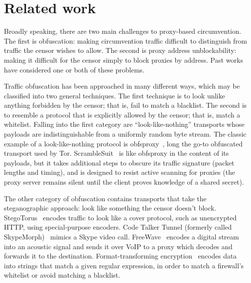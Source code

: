 \documentclass{article}
\begin{document}

\section{Related work}


Broadly speaking, there are two main challenges to proxy-based circumvention.
The first is obfuscation: making circumvention traffic difficult to distinguish
from traffic the censor wishes to allow. The second is proxy address
unblockability: making it difficult for the censor simply to block proxies by
address. Past works have considered one or both of these problems.

Traffic obfuscation has been approached in many different ways,
which may be classified into two general techniques.
The first technique is to look unlike
anything forbidden by the censor; that is, fail to match a blacklist. The second is
to resemble a protocol that is explicitly allowed by the censor; that is, match a whitelist.
Falling into the first category are ``look-like-nothing'' transports whose
payloads are indistinguishable from a uniformly random byte stream.
The classic example of a look-like-nothing
protocol is obfsproxy~\cite{obfsproxy}, long the go-to obfuscated
transport used by Tor. ScrambleSuit~\cite{scramblesuit} is like obfsproxy in the
content of its payloads, but it takes additional steps to obscure its traffic signature
(packet lengths and timing), and is designed to resist active scanning for proxies
(the proxy server remains silent until the client proves knowledge of a shared
secret).

The other category of obfuscation contains transports that take the steganographic approach: look like
something the censor doesn't block. StegoTorus~\cite{stegotorus}
encodes traffic to look like a cover protocol, such as unencrypted HTTP,
using special-purpose encoders.
Code Talker
Tunnel (formerly called SkypeMorph)~\cite{skypemorph} mimics a Skype video call.
FreeWave~\cite{freewave} encodes a digital stream into an acoustic signal
and sends it over VoIP to a proxy which decodes and forwards it to the destination.
Format-transforming encryption~\cite{fte} encodes data into strings that match a given regular expression,
in order to match a firewall's whitelist or avoid matching a blacklist.
\end{document}
